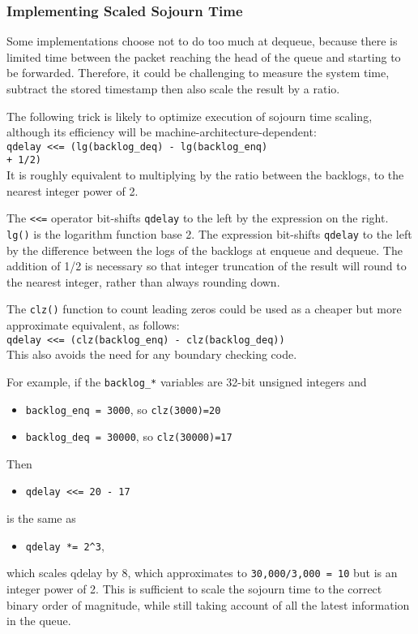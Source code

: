 \subsubsection{Implementing Scaled Sojourn Time}\label{sec:inst_svc_time_impl}

Some implementations choose not to do too much at dequeue, because there is limited time between the packet reaching the head of the queue and starting to be forwarded. Therefore, it could be challenging to measure the system time, subtract the stored timestamp then also scale the result by a ratio.

The following trick is likely to optimize execution of sojourn time scaling, although its efficiency will be machine-architecture-dependent:\\
{\small\texttt{qdelay <<= (lg(backlog\_deq) - lg(backlog\_enq)\\+ 1/2)}}\\
It is roughly equivalent to multiplying by the ratio between the backlogs, to the nearest integer power of 2.

The \texttt{<<=} operator bit-shifts \texttt{qdelay} to the left by the expression on the right. \texttt{lg()} is the logarithm function base 2. The expression bit-shifts \texttt{qdelay} to the left by the difference between the logs of the backlogs at enqueue and dequeue. The addition of 1/2 is necessary so that integer truncation of the result will round to the nearest integer, rather than always rounding down. 

The \texttt{clz()} function to count leading zeros could be used as a cheaper but more approximate equivalent, as follows:\\
{\small\texttt{qdelay <<= (clz(backlog\_enq) - clz(backlog\_deq))}}\\
This also avoids the need for any boundary checking code.

For example, if the \texttt{backlog\_*} variables are 32-bit unsigned integers and
\begin{itemize}[nosep]
	\item[] \texttt{backlog\_enq = 3000}, so \texttt{clz(3000)=20}
	\item[] \texttt{backlog\_deq = 30000}, so \texttt{clz(30000)=17}
\end{itemize}
Then
\begin{itemize}[nosep]
	\item[] \texttt{qdelay <<= 20 - 17}
\end{itemize}
is the same as
\begin{itemize}[nosep]
    \item[] \texttt{qdelay *= 2\^{}3},\\
\end{itemize}
which scales qdelay by 8, which approximates to \texttt{30,000/3,000 = 10} but is an integer power of 2. This is sufficient to scale the sojourn time to the correct binary order of magnitude, while still taking account of all the latest information in the queue.

